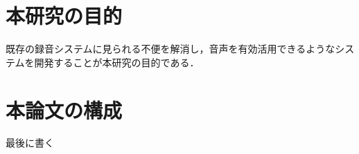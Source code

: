 \section{本研究の目的}

 既存の録音システムに見られる不便を解消し，音声を有効活用できるようなシステムを開発することが本研究の目的である．

\section{本論文の構成}

最後に書く
